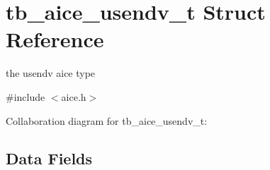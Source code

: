 \hypertarget{structtb__aice__usendv__t}{\section{tb\-\_\-aice\-\_\-usendv\-\_\-t Struct Reference}
\label{structtb__aice__usendv__t}
}


the usendv aice type  




{\ttfamily \#include $<$aice.\-h$>$}



Collaboration diagram for tb\-\_\-aice\-\_\-usendv\-\_\-t\-:
\subsection*{Data Fields}
